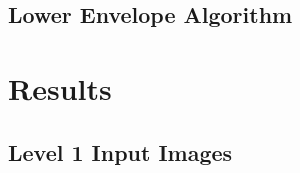 \documentclass[12pt,twoside]{reedthesis}
\begin{document}
\section{Lower Envelope Algorithm}
\chapter{Results}
\section{Level 1 Input Images}

   \clearpage


  \backmatter %

    \nocite{*}

\renewcommand{\bibname}{Works Cited}

%  
 

\end{document}

